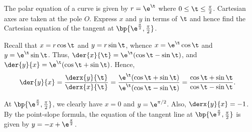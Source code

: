 \begin{solution}
    \begin{center}
    \end{center}
\end{solution}

\begin{problem}
    The polar equation of a curve is given by $r = \e^\t$ where $0 \leq \t \leq \frac\pi2$. Cartesian axes are taken at the pole $O$. Express $x$ and $y$ in terms of $\t$ and hence find the Cartesian equation of the tangent at $\bp{\e^{\frac\pi2}, \frac\pi2}$.
\end{problem}
\begin{solution}
    Recall that $x = r\cos\t$ and $y = r\sin\t$, whence $x = \e^\t\cos\t$ and $y = \e^\t\sin\t$. Thus, $\der{x}{\t} = \e^\t(\cos\t - \sin\t)$, and $\der{y}{x} = \e^\t(\cos\t + \sin\t)$. Hence, \[\der{y}{x} = \frac{\derx{y}{\t}}{\derx{x}{\t}} = \frac{\e^\t (\cos\t + \sin\t)}{\e^\t (\cos\t - \sin\t)} = \frac{\cos\t+\sin\t}{\cos\t-\sin\t}.\]

    At $\bp{\e^{\frac\pi2}, \frac\pi2}$, we clearly have $x = 0$ and $y = \e^{\pi/2}$. Also, $\derx{y}{x} = -1$. By the point-slope formula, the equation of the tangent line at $\bp{\e^{\frac\pi2}, \frac\pi2}$ is given by $y = -x + \e^{\frac\pi2}$.
\end{solution}

